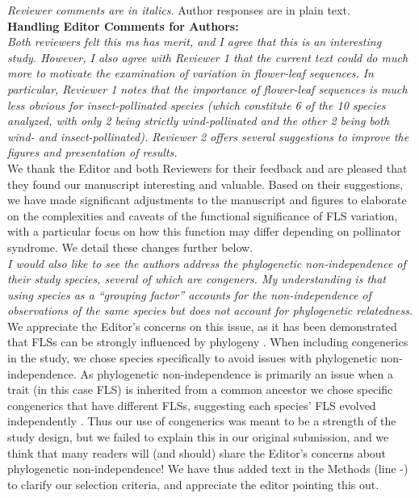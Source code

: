 \documentclass[11pt]{article}
\begin{document}
\emph{Reviewer comments are in italics.} Author responses are in plain text.\\

\textbf{Handling Editor Comments for Authors:}\\

\emph{Both reviewers felt this ms has merit, and I agree that this is an interesting study. However, I also agree with Reviewer 1 that the current text could do much more to motivate the examination of variation in flower-leaf sequences. In particular, Reviewer 1 notes that the importance of flower-leaf sequences is much less obvious for insect-pollinated species (which constitute 6 of the 10 species analyzed, with only 2 being strictly wind-pollinated and the other 2 being both wind- and insect-pollinated). Reviewer 2 offers several suggestions to improve the figures and presentation of results.}\\

\noindent We thank the Editor and both Reviewers for their feedback and are pleased that they found our manuscript interesting and valuable. Based on their suggestions, we have made significant adjustments to the manuscript and figures to elaborate on the complexities and caveats of the functional significance of FLS variation, with a particular focus on how this function may differ depending on pollinator syndrome. We detail these changes further below.\\

\emph{I would also like to see the authors address the phylogenetic non-independence of their study species, several of which are congeners. My understanding is that using species as a ``grouping factor'' accounts for the non-independence of observations of the same species but does not account for phylogenetic relatedness.}\\

\noindent We appreciate the Editor's concerns on this issue, as it has been demonstrated that FLSs can be strongly influenced by phylogeny \citep{Buonaiuto2020,Gougherty2018}. When including congenerics in the study, we chose species specifically to avoid issues with phylogenetic non-independence. As phylogenetic non-independence is primarily an issue when a trait (in this case FLS) is inherited from a common ancestor we chose specific congenerics that have different FLSs, suggesting each species' FLS evolved independently \citep{Revell:2010aa}. Thus our use of congenerics was meant to be a strength of the study design, but we failed to explain this in our original submission, and we think that many readers will (and should) share the Editor's concerns about phylogenetic non-independence! We have thus added text in the Methods (line -) to clarify our selection criteria, and appreciate the editor pointing this out.\\ 
\end{document}
